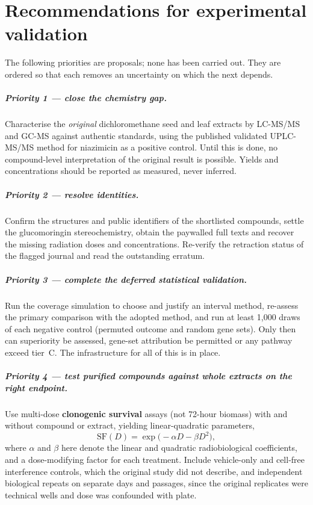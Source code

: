 \chapter{Recommendations for experimental validation}\label{ch:recommendations}

The following priorities are proposals; none has been carried out. They are ordered so that
each removes an uncertainty on which the next depends.

\paragraph{Priority 1 --- close the chemistry gap.} Characterise the \emph{original}
dichloromethane seed and leaf extracts by LC-MS/MS and GC-MS against authentic standards,
using the published validated UPLC-MS/MS method for niazimicin \parencite{abdelsayed2021jfda}
as a positive control. Until this is done, no compound-level interpretation of the original
result is possible. Yields and concentrations should be reported as measured, never inferred.

\paragraph{Priority 2 --- resolve identities.} Confirm the structures and public identifiers of
the shortlisted compounds, settle the glucomoringin stereochemistry, obtain the paywalled
full texts and recover the missing radiation doses and concentrations. Re-verify the
retraction status of the flagged journal and read the outstanding erratum.

\paragraph{Priority 3 --- complete the deferred statistical validation.} Run the coverage
simulation to choose and justify an interval method, re-assess the primary comparison with
the adopted method, and run at least 1,000 draws of each negative control (permuted outcome
and random gene sets). Only then can superiority be assessed, gene-set attribution be
permitted or any pathway exceed tier~C. The infrastructure for all of this is in place.

\paragraph{Priority 4 --- test purified compounds against whole extracts on the right
endpoint.} Use multi-dose \textbf{clonogenic survival} assays (not 72-hour biomass) with and
without compound or extract, yielding linear-quadratic parameters,
\begin{equation}
  \mathrm{SF}(D) = \exp\bigl(-\alpha D-\beta D^{2}\bigr),
  \label{eq:lq}
\end{equation}
where $\alpha$ and $\beta$ here denote the linear and quadratic radiobiological coefficients,
and a dose-modifying factor for each treatment. Include vehicle-only and cell-free
interference controls, which the original study did not describe, and independent biological
repeats on separate days and passages, since the original replicates were technical wells and
dose was confounded with plate.

